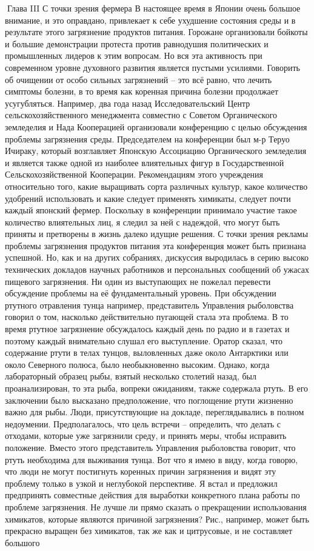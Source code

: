 \documentclass[a4paper]{book}
\begin{document}
Глава III С точки зрения фермера
В настоящее время в Японии очень большое внимание, и это оправдано, привлекает к
себе ухудшение состояния среды и в результате этого загрязнение продуктов питания.
Горожане организовали бойкоты и большие демонстрации протеста против равнодушия
политических и промышленных лидеров к этим вопросам. Но вся эта активность при
современном уровне духовного развития является пустыми усилиями. Говорить об очищении
от особо сильных загрязнений – это всё равно, что лечить симптомы болезни, в то время как
коренная причина болезни продолжает усугубляться.
Например, два года назад Исследовательский Центр сельскохозяйственного
менеджмента совместно с Советом Органического земледелия и Нада Кооперацией
организовали конференцию с целью обсуждения проблемы загрязнения среды.
Председателем на конференции был м-р Теруо Ичираку, который возглавляет Японскую
Ассоциацию Органического земледелия и является также одной из наиболее влиятельных
фигур в Государственной Сельскохозяйственной Кооперации. Рекомендациям этого
учреждения относительно того, какие выращивать сорта различных культур, какое
количество удобрений использовать и какие следует применять химикаты, следует почти
каждый японский фермер.
Поскольку в конференции принимало участие такое количество влиятельных лиц, я
следил за ней с надеждой, что могут быть приняты и претворены в жизнь далеко идущие
решения. С точки зрения рекламы проблемы загрязнения продуктов питания эта
конференция может быть признана успешной. Но, как и на других собраниях, дискуссия
выродилась в серию высоко технических докладов научных работников и персональных
сообщений об ужасах пищевого загрязнения. Ни один из выступающих не пожелал перевести
обсуждение проблемы на её фундаментальный уровень.
При обсуждении ртутного отравления тунца например, представитель Управления
рыболовства говорил о том, насколько действительно пугающей стала эта проблема. В то
время ртутное загрязнение обсуждалось каждый день по радио и в газетах и поэтому каждый
внимательно слушал его выступление.
Оратор сказал, что содержание ртути в телах тунцов, выловленных даже около
Антарктики или около Северного полюса, было необыкновенно высоким. Однако, когда
лабораторный образец рыбы, взятый несколько столетий назад, был проанализирован, то эта
рыба, вопреки ожиданиям, также содержала ртуть. В его заключении было высказано
предположение, что поглощение ртути жизненно важно для рыбы.
Люди, присутствующие на докладе, переглядывались в полном недоумении.
Предполагалось, что цель встречи – определить, что делать с отходами, которые уже
загрязнили среду, и принять меры, чтобы исправить положение. Вместо этого представитель
Управления рыболовства говорит, что ртуть необходима для выживания тунца. Вот что я
имею в виду, когда говорю, что люди не могут постигнуть коренных причин загрязнения и
видят эту проблему только в узкой и неглубокой перспективе.
Я встал и предложил предпринять совместные действия для выработки конкретного
плана работы по проблеме загрязнения. Не лучше ли прямо сказать о прекращении
использования химикатов, которые являются причиной загрязнения? Рис., например, может
быть прекрасно выращен без химикатов, так же как и цитрусовые, и не составляет большого
\end{document}
